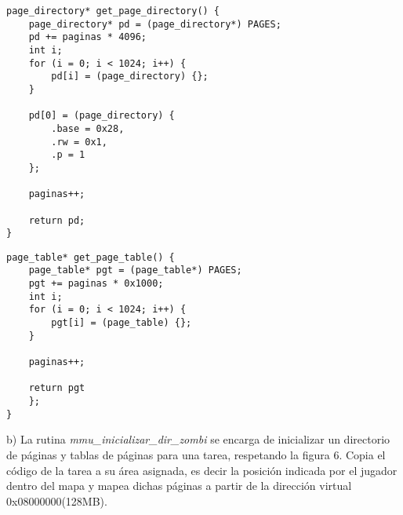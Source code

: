 \documentclass[a4paper]{article}
\begin{document}
\begin{codesnippet}
\begin{verbatim}
page_directory* get_page_directory() {
    page_directory* pd = (page_directory*) PAGES;
    pd += paginas * 4096;
    int i;
    for (i = 0; i < 1024; i++) {
        pd[i] = (page_directory) {};
    }

    pd[0] = (page_directory) {
        .base = 0x28,
        .rw = 0x1,
        .p = 1
    };

    paginas++;

    return pd;
}
\end{verbatim}
\end{codesnippet}


\begin{codesnippet}
\begin{verbatim}
page_table* get_page_table() {
    page_table* pgt = (page_table*) PAGES;
    pgt += paginas * 0x1000;
    int i;
    for (i = 0; i < 1024; i++) {
        pgt[i] = (page_table) {};
    }

    paginas++;

    return pgt
    };
}
\end{verbatim}
\end{codesnippet}
{\large b)} La rutina \textit{mmu_inicializar_dir_zombi} se encarga de inicializar un directorio
de p\'aginas y tablas de p\'aginas para una tarea, respetando la figura 6. Copia
el c\'odigo de la tarea a su \'area asignada, es decir la posici\'on indicada por el jugador dentro
del mapa y mapea dichas p\'aginas a partir de la direcci\'on virtual 0x08000000(128MB).
\end{document}

